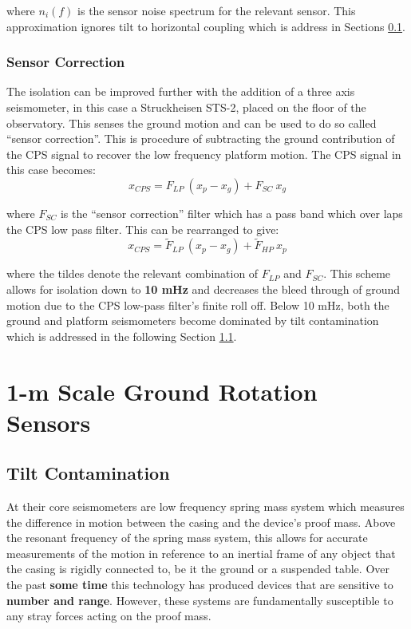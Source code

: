 \documentclass [12pt, proquest]{uwthesis}[2019]
\begin{document}
where $n_{i}(f)$ is the sensor noise spectrum for the relevant sensor. This approximation ignores tilt to horizontal coupling which is address in Sections \ref{}.

\subsection{Sensor Correction}

The isolation can be improved further with the addition of a three axis seismometer, in this case a Struckheisen STS-2, placed on the floor of the observatory. This senses the ground motion and can be used to do so called ``sensor correction''. This is procedure of subtracting the ground contribution of the CPS signal to recover the low frequency platform motion. The CPS signal in this case becomes:
\begin{equation}
x_{CPS}=F_{LP}\ (x_p-x_g)+F_{SC}\ x_g
\end{equation}

where $F_{SC}$ is the ``sensor correction'' filter which has a pass band which over laps the CPS low pass filter. This can be rearranged to give:
\begin{equation}
x_{CPS}=\tilde F_{LP}\ (x_p-x_g)+\tilde F_{HP}\ x_p
\end{equation}

where the tildes denote the relevant combination of $F_{LP}$ and $F_{SC}$. This scheme allows for isolation down to \textbf{10 mHz} and decreases the bleed through of ground motion due to the CPS low-pass filter's finite roll off. Below 10 mHz, both the ground and platform seismometers become dominated by tilt contamination which is addressed in the following Section \ref{tiltCon}.

\chapter{1-m Scale Ground Rotation Sensors} \label{BRS_chap}
\section{Tilt Contamination}\label{tiltCon}
\quad At their core seismometers are low frequency spring mass system which measures the difference in motion between the casing and the device's proof mass. Above the resonant frequency of the spring mass system, this allows for accurate measurements of the motion in reference to an inertial frame of any object that the casing is rigidly connected to, be it the ground or a suspended table. Over the past \textbf{some time} this technology has produced devices that are sensitive to \textbf{number and range}. However, these systems are fundamentally susceptible to any stray forces acting on the proof mass.
\end{document}
